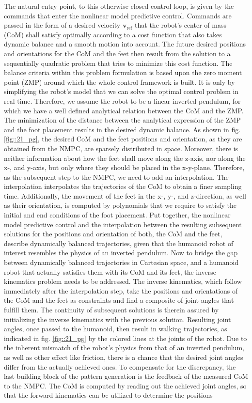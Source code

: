 The natural entry point, to this otherwise closed control loop, is given by the commands that enter the nonlinear model predictive control. Commands are passed in the form of a desired velocity $\mathbf{v}_\text{ref}$ that the robot's center of mass (CoM) shall satisfy optimally according to a cost function that also takes dynamic balance and a smooth motion into account. The future desired positions and orientations for the CoM and the feet then result from the solution to a sequentially quadratic problem that tries to minimize this cost function. The balance criteria within this problem formulation is based upon the zero moment point (ZMP) around which the whole control framework is built. It is only by simplifying the robot's model that we can solve the optimal control problem in real time. Therefore, we assume the robot to be a linear inverted pendulum, for which we have a well defined analytical relation between the CoM and the ZMP. The minimization of the distance between the analytical expression of the ZMP and the foot placement results in the desired dynamic balance. As shown in fig. \ref{fig::21_pg}, the desired CoM and the feet positions and orientation, as they are obtained from the NMPC, are sparsely distributed in space. Moreover, there is neither information about how the feet shall move along the z-axis, nor along the x-, and y-axis, but only where they should be placed in the x-y-plane. Therefore, as the subsequent step to the NMPC, we need to add an interpolation. The interpolation interpolates the trajectories of the CoM to obtain a finer sampling time. Additionally, the movement of the feet in the x-, y-, and z-direction, as well as their orientation, is computed by polynomials that we require to satisfy the initial and end conditions of the foot placement. Put together, the nonlinear model predictive control and the interpolation between the resulting subsequent solutions for the positions and orientation of both, the CoM and the feet, describe dynamically balanced trajectories, given that the humanoid robot of interest resembles the physics of an inverted pendulum. Now to bridge the gap between dynamically balanced trajectories in Cartesian space, and a humanoid robot that actually satisfies them with its CoM and its feet, the inverse kinematics problem needs to be addressed. The inverse kinematics, which follow immediately after the interpolation step, take the positions and orientations of the CoM and the feet as constraints and find a composite of joint angles that fulfill them. The continuity of subsequent solutions is therein assured by initializing the inverse kinematics with the previous solution. Resulting joint angles, once passed to the humanoid, then result in walking trajectories, as indicated in fig. \ref{fig::21_pg} by the colored lines at the joints of the robot. Due to the inherent mismatch of the robot's physics from that of an inverted pendulum, as well as other effect like friction, there is a chance that the desired joint angles differ from the actually achieved ones. To compensate for the discrepancy, the last building block of the pattern generation is the feedback of the measured CoM to the NMPC. The CoM is computed by reading out the achieved joint angles, so that the forward kinematics can be utilized to determine the positions 